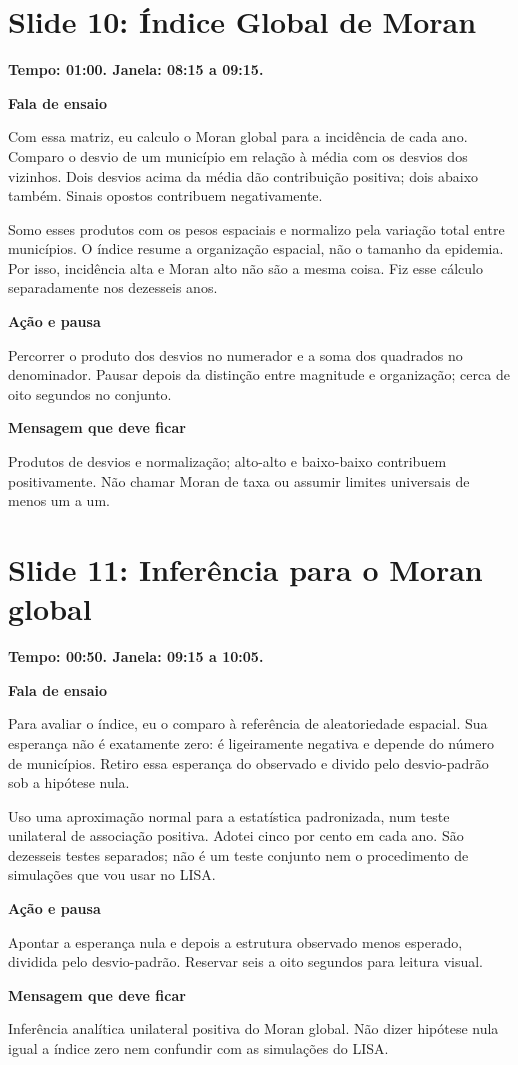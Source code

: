 \documentclass[11pt,a4paper]{article}
\newcommand{\bloco}[1]{\par\Needspace{3\baselineskip}\textbf{#1}\par}
\newcommand{\slide}[2]{\Needspace{13\baselineskip}\section*{Slide #1: #2}}
\begin{document}
\par\begin{minipage}{\textwidth}
\slide{10}{Índice Global de Moran}
{\color{azul}\textbf{Tempo: 01:00. Janela: 08:15 a 09:15.}}\par
\bloco{Fala de ensaio}
Com essa matriz, eu calculo o Moran global para a incidência de cada ano. Comparo o desvio de um município em relação à média com os desvios dos vizinhos. Dois desvios acima da média dão contribuição positiva; dois abaixo também. Sinais opostos contribuem negativamente.

Somo esses produtos com os pesos espaciais e normalizo pela variação total entre municípios. O índice resume a organização espacial, não o tamanho da epidemia. Por isso, incidência alta e Moran alto não são a mesma coisa. Fiz esse cálculo separadamente nos dezesseis anos.
\bloco{Ação e pausa}
Percorrer o produto dos desvios no numerador e a soma dos quadrados no denominador. Pausar depois da distinção entre magnitude e organização; cerca de oito segundos no conjunto.
\bloco{Mensagem que deve ficar}
Produtos de desvios e normalização; alto-alto e baixo-baixo contribuem positivamente. Não chamar Moran de taxa ou assumir limites universais de menos um a um.
\end{minipage}\par\bigskip
\par\begin{minipage}{\textwidth}
\slide{11}{Inferência para o Moran global}
{\color{azul}\textbf{Tempo: 00:50. Janela: 09:15 a 10:05.}}\par
\bloco{Fala de ensaio}
Para avaliar o índice, eu o comparo à referência de aleatoriedade espacial. Sua esperança não é exatamente zero: é ligeiramente negativa e depende do número de municípios. Retiro essa esperança do observado e divido pelo desvio-padrão sob a hipótese nula.

Uso uma aproximação normal para a estatística padronizada, num teste unilateral de associação positiva. Adotei cinco por cento em cada ano. São dezesseis testes separados; não é um teste conjunto nem o procedimento de simulações que vou usar no LISA.
\bloco{Ação e pausa}
Apontar a esperança nula e depois a estrutura observado menos esperado, dividida pelo desvio-padrão. Reservar seis a oito segundos para leitura visual.
\bloco{Mensagem que deve ficar}
Inferência analítica unilateral positiva do Moran global. Não dizer hipótese nula igual a índice zero nem confundir com as simulações do LISA.
\end{minipage}\par\bigskip
\end{document}
